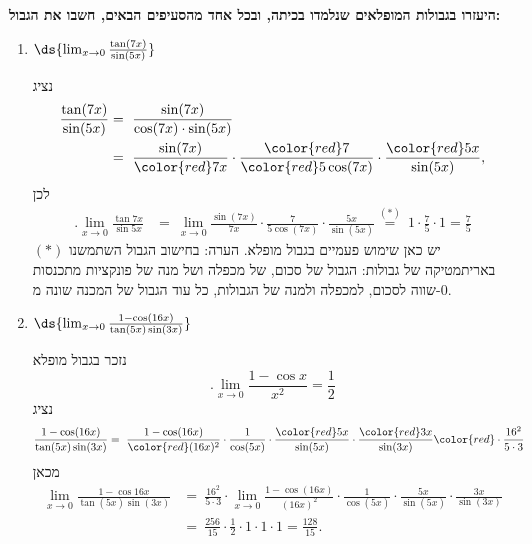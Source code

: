 \textbf{
היעזרו בגבולות המופלאים שנלמדו בכיתה,
ובכל אחד מהסעיפים הבאים,
חשבו את הגבול: }
\begin{enumerate}
\item $\ds{ \lim_{x \to 0} \frac{\tan(7x)}{\sin(5x)}}$

\ifsol
\begin{solbox}
נציג
\begin{align*}
    \frac{\tan(7x)}{\sin(5x)}&=\ \frac{\sin(7x)}{\cos(7x)\cdot\sin(5x)}\\
    &=\ \frac{\sin(7x)}{\color{red}7x}\cdot\frac{\color{red}7}{{\color{red}5}\cos(7x)}\cdot\frac{\color{red}5x}{\sin(5x)},
\end{align*}
לכן
\begin{align*}
    .\lim_{x\to0}\frac{\tan7x}{\sin5x}
    &=\ \lim_{x\to0}\frac{\sin(7x)}{7x}\cdot\frac{7}{5\cos(7x)}\cdot\frac{5x}{\sin(5x)}
    \overset{(\ast)}{=}\ 1\cdot\frac{7}{5}\cdot1
    =\frac{7}{5}
\end{align*}
$(\ast)$
יש כאן שימוש פעמיים בגבול מופלא.
הערה: בחישוב הגבול השתמשנו באריתמטיקה של גבולות: הגבול של סכום, של מכפלה ושל מנה של פונקציות מתכנסות שווה לסכום, למכפלה ולמנה של הגבולות, כל עוד הגבול של המכנה שונה מ-$0$.
\end{solbox}
\fi

\item $\ds{ \lim_{x \to 0} \frac{1-\cos(16x)}{\tan(5x)\sin(3x)}}$

\ifsol
{}
\begin{solbox}
נזכר בגבול מופלא
$$.\lim_{x\to0}\frac{1-\cos x}{x^2}=\frac{1}{2}$$
נציג
\begin{align*}
    \frac{1-\cos(16x)}{\tan(5x)\sin(3x)}&=\ \frac{1-\cos(16x)}{\color{red}(16x)^2}\cdot\frac{1}{\cos(5x)}\cdot\frac{\color{red}5x}{\sin(5x)}\cdot\frac{\color{red}3x}{\sin(3x)}{\color{red}\cdot\frac{16^2}{5\cdot3}}
\end{align*}
מכאן
\begin{align*}
    \lim_{x\to0}\frac{1-\cos16x}{\tan(5x)\sin(3x)}
    &=\ \frac{16^2}{5\cdot3}\cdot\lim_{x\to0} \frac{1-\cos(16x)}{(16x)^2}\cdot\frac{1}{\cos(5x)}\cdot\frac{5x}{\sin(5x)}\cdot\frac{3x}{\sin(3x)}\\
    &=\ \frac{256}{15}\cdot\frac{1}{2}\cdot1\cdot1\cdot1
    = \frac{128}{15}.
\end{align*}


\end{solbox}
\end{enumerate}
